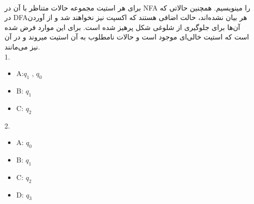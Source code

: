 
\\
{برای هر استیت مجموعه حالات متناظر با آن در NFA را مینویسیم.
همچنین حالاتی که در DFAهر بیان نشده‌اند، حالت اضافی هستند که اکسپت نیز نخواهند شد و از آوردن آن‌ها برای جلوگیری از شلوغی شکل پرهیز شده است. برای این موارد فرض شده است که استیت خالی‌ای  موجود است و حالات نامطلوب به آن استیت میروند و در آن نیز می‌مانند.
\\
1.
\begin{latin}
	\begin{itemize}
		\item
		A:{{$q_1$} , {$q_0$} }
		\item
		B:{ {$q_1$} }
		\item
		C:{ {$q_2$} }
	\end{itemize}
\end{latin}
\begin{center}
\end{center}

2.
\begin{latin}
	\begin{itemize}
	\item
 	A:{ {$q_0$} }
    \item
    B:{ {$q_1$} }
    \item
    C:{ {$q_2$} }
    \item
    D:{ {$q_3$} }
\end{itemize}
\end{latin}

}
